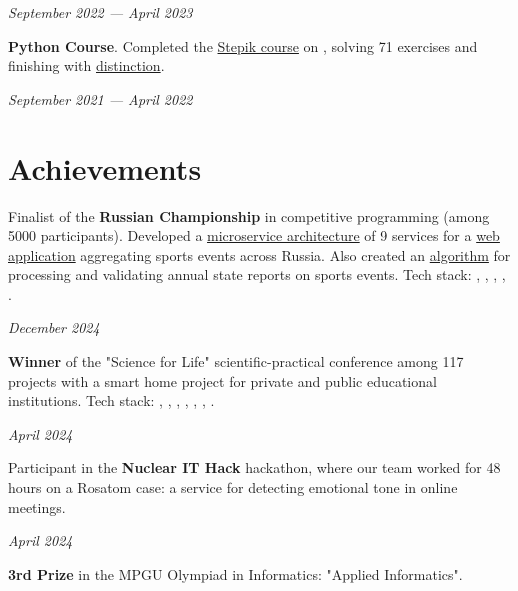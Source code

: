 \documentclass[margin,line]{resume}
\begin{document}
\begin{resume}
  \hfill \textsl{September 2022 — April 2023}

  \textbf{Python Course}. Completed the
  \href{https://stepik.org/course/67}{Stepik course} on
  , solving 71 exercises and finishing with
  \href{https://alchemmist.github.io/CV/attachments/stepik-python-course.pdf}{distinction}.

  \vspace{-7mm}

  \hfill \textsl{September 2021 — April 2022}

  \section{\mysidestyle Achievements}
  Finalist of the \textbf{Russian Championship} in competitive
  programming (among 5000 participants). Developed a
  \href{https://alchemmist.github.io/CV/attachments/architect.pdf}{microservice
  architecture} of 9 services for a
  \href{https://github.com/alchemmist/sportprog}{web application}
  aggregating sports events across Russia. Also created an
  \href{https://github.com/alchemmist/sport-afisha/blob/main/event_parsing_service/parse_pdf.py}{algorithm}
  for processing and validating annual state reports on sports
  events. Tech stack: , ,
  , , .

  \vspace{-6mm}

  \hfill \textsl{December 2024}

  \textbf{Winner} of the "Science for Life" scientific-practical
  conference among 117 projects with a smart home project for private
  and public educational institutions. Tech stack:
  , ,
  , , ,
  , .
  \vspace{-6mm}

  \hfill \textsl{April 2024}

  Participant in the \textbf{Nuclear IT Hack} hackathon, where our
  team worked for 48 hours on a Rosatom case: a service for detecting
  emotional tone in online meetings.

  \vspace{-7mm}

  \hfill \textsl{April 2024}

  \textbf{3rd Prize} in the MPGU Olympiad in Informatics: "Applied Informatics".
  \vspace{-2mm}


\end{resume}
\end{document}
